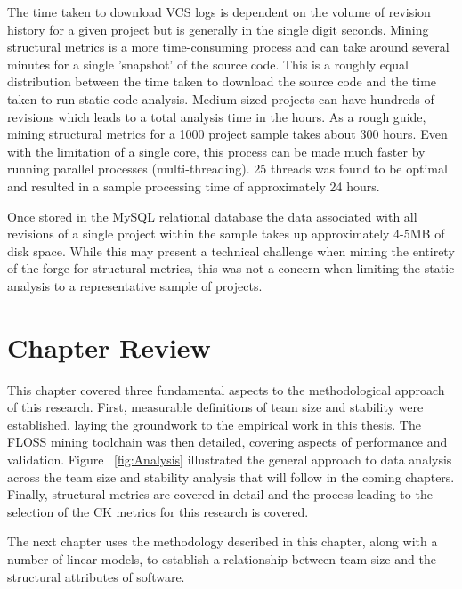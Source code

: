 The time taken to download VCS logs is dependent on the volume of revision history for a given project but is generally in the single digit seconds. Mining structural metrics is a more time-consuming process and can take around several minutes for a single 'snapshot' of the source code. This is a roughly equal distribution between the time taken to download the source code and the time taken to run static code analysis. Medium sized projects can have hundreds of revisions which leads to a total analysis time in the hours. As a rough guide, mining structural metrics for a 1000 project sample takes about 300 hours. Even with the limitation of a single core, this process can be made much faster by running parallel processes (multi-threading). 25 threads was found to be optimal and resulted in a sample processing time of approximately 24 hours.

Once stored in the MySQL relational database the data associated with all revisions of a single project within the sample takes up approximately 4-5MB of disk space. While this may present a technical challenge when mining the entirety of the forge for structural metrics, this was not a concern when limiting the static analysis to a representative sample of projects.

\section{Chapter Review} %
This chapter covered three fundamental aspects to the methodological approach of this research. First, measurable definitions of team size and stability were established, laying the groundwork to the empirical work in this thesis. The FLOSS mining toolchain was then detailed, covering aspects of performance and validation. Figure ~\ref{fig:Analysis} illustrated the general approach to data analysis across the team size and stability analysis that will follow in the coming chapters. Finally, structural metrics are covered in detail and the process leading to the selection of the CK metrics for this research is covered.

The next chapter uses the methodology described in this chapter, along with a number of linear models, to establish a relationship between team size and the structural attributes of software. 